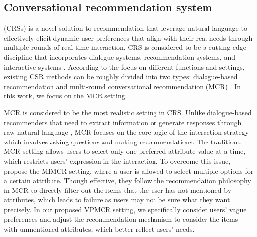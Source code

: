 \subsection{Conversational recommendation system} (CRSs) is a novel solution to recommendation that leverage natural language to effectively elicit dynamic user preferences that align with their real needs through multiple rounds of real-time interaction. CRS is considered to be a cutting-edge discipline that incorporates dialogue systems, recommendation systems, and interactive systems \cite{gao2021advances}.
According to the focus on different functions and settings, existing CSR methods can be roughly divided into two types: dialogue-based recommendation \cite{nips18/DeepConv,zhou2020topicguided,chen-etal-2019-towards,10.1145/3488560.3498514,wu2019proactive} and multi-round conversational recommendation (MCR) \cite{lei2020interactive,deng2021unified,xu2021adapting,10.1145/3523227.3546755,gao2022kuairec,li2020seamlessly}. In this work, we focus on the MCR setting.

MCR is considered to be the most realistic setting in CRS. Unlike dialogue-based recommenders that need to extract information or generate responses through raw natural language \cite{10.1145/3534678.3539382}, MCR focuses on the core logic of the interaction strategy which involves asking questions \cite{10.1145/3397271.3401180,10.1145/3397271.3401180,10.1145/3477495.3532077} and making recommendations.
The traditional MCR setting allows users to select only one preferred attribute value at a time, which restricts users' expression in the interaction. 
To overcome this issue, \citet{zhang2022multiple} propose the MIMCR setting, where a user is allowed to select multiple options for a certain attribute. Though effective, they follow the recommendation philosophy in MCR to directly filter out the items that the user has not mentioned by attributes, which leads to failure as users may not be sure what they want precisely. In our proposed VPMCR setting, we specifically consider users' vague preferences and adjust the recommendation mechanism to consider the items with unmentioned attributes, which better reflect users' needs.

